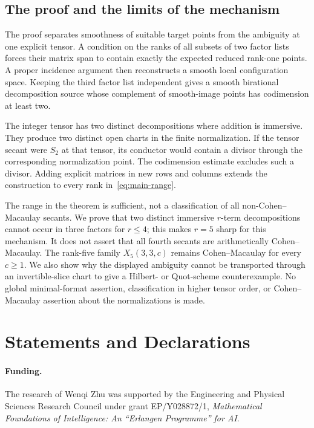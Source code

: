 \documentclass[10pt,a4paper]{article}
\theoremstyle{definition}
\theoremstyle{remark}
\numberwithin{equation}{section}
\begin{document}


\subsection{The proof and the limits of the mechanism}

The proof separates smoothness of suitable target points from the
ambiguity at one explicit tensor. A condition on the ranks of all
subsets of two factor lists forces their matrix span to contain
exactly the expected reduced rank-one points. A proper incidence
argument then reconstructs a smooth local configuration space.
Keeping the third factor list independent gives a smooth
birational decomposition source whose complement of smooth-image
points has codimension at least two.

The integer tensor has two distinct decompositions where addition
is immersive. They produce two distinct open charts in the finite
normalization. If the tensor secant were $S_2$ at that tensor, its
conductor would contain a divisor through the corresponding
normalization point. The codimension estimate excludes such a divisor.
Adding explicit matrices in new rows and columns extends the
construction to every rank in~\eqref{eq:main-range}.

The range in the theorem is sufficient, not a classification of all
non-Cohen--Macaulay secants. We prove that two distinct immersive
$r$-term decompositions cannot occur in three factors for $r\leq4$;
this makes $r=5$ sharp for this mechanism. It does not assert that
all fourth secants are arithmetically Cohen--Macaulay.
The rank-five family $X_5(3,3,c)$ remains Cohen--Macaulay for every
$c\geq1$. We also show why the displayed ambiguity cannot be
transported through an invertible-slice chart to give a Hilbert- or
Quot-scheme counterexample. No global minimal-format assertion,
classification in higher tensor order, or Cohen--Macaulay assertion
about the normalizations is made.










\section*{Statements and Declarations}
\paragraph{Funding.}
The research of Wenqi Zhu was supported by the Engineering and Physical
Sciences Research Council under grant EP/Y028872/1, \emph{Mathematical
Foundations of Intelligence: An ``Erlangen Programme'' for AI}.
\end{document}
